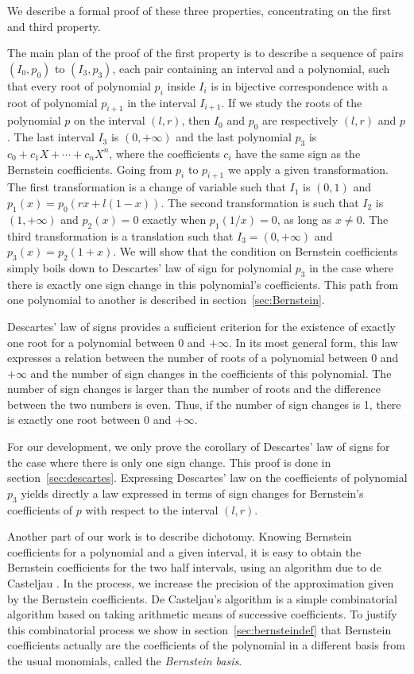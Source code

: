 \documentclass{mscs}
\begin{document}
We describe a formal proof of these three properties,
concentrating on the first and third property.

The main plan of the proof of the first property is to describe a
sequence of pairs \((I_0, p_0)\) to \((I_3, p_3)\), each pair
containing an interval and a polynomial, such that every root of
polynomial \(p_i\) inside \(I_i\) is in bijective correspondence with
a root of polynomial \(p_{i+1}\) in the interval \(I_{i+1}\).  If we
study the roots of the polynomial $p$ on the interval $(l, r)$,
then $I_0$ and $p_0$ are respectively $(l, r)$ and $p$.
The last interval $I_3$ is \((0, +\infty)\) and the last polynomial
$p_3$ is \(c_0 + c_1 X + \cdots + c_n X^n\), where the coefficients
\(c_i\) have the
same sign as the Bernstein coefficients.  Going from \(p_i\) to
\(p_{i+1}\) we apply a given transformation.  The first transformation
is a change of variable such that \(I_1\) is \((0,1)\) and \(p_1(x) =
p_0(r x + l (1 - x))\).  The second transformation is such that
\(I_2\) is \((1,+\infty)\) and \(p_2(x) = 0\) exactly when \(p_1(1/x)
= 0\), as long as \(x\neq 0\).  The third transformation is a
translation such that \(I_3 = (0,+\infty)\) and \(p_3(x) = p_2(1+x)\).
We will show that the condition on Bernstein coefficients simply
boils down to Descartes' law of sign \cite{descartes, bpr} for
polynomial \(p_3\) in the
case where there is exactly one sign change in this polynomial's coefficients.
This path from one polynomial to another is described in section~\ref{sec:Bernstein}.

Descartes' law of signs provides a sufficient criterion for the
existence of exactly one root for a polynomial
between 0 and \(+\infty\).  In its
most general form, this law
expresses a relation between the number of roots of a polynomial
between 0 and \(+\infty\) and the number of sign changes in the
coefficients of this polynomial.  The number of sign changes is larger
than the number of roots and the difference between the two numbers is
even.  Thus, if the number of sign changes is 1, there is
exactly one root between 0 and \(+\infty\).

For our development, we only prove the corollary  of
Descartes' law of signs for the case where there is only one sign
change.    This proof is done in section~\ref{sec:descartes}.
  Expressing Descartes' law on the coefficients of polynomial
\(p_3\) yields directly a law expressed in terms of sign changes for
Bernstein's coefficients of \(p\) with respect to the
interval
\((l,r)\).

Another part of our work is to describe dichotomy.  Knowing Bernstein
coefficients for a polynomial and a given interval, it is easy to
obtain the Bernstein coefficients for the two half intervals, using
an algorithm due to de Casteljau \cite{castel}.  In the process, we increase
the precision of the approximation given by the Bernstein
coefficients.  De Casteljau's algorithm is a simple combinatorial
algorithm based on taking arithmetic means of successive coefficients.
To justify this combinatorial process we show in
section~\ref{sec:bernsteindef} that Bernstein
coefficients actually are the coefficients of the polynomial in a
different basis from the usual monomials, called the {\em Bernstein basis}.
\end{document}
